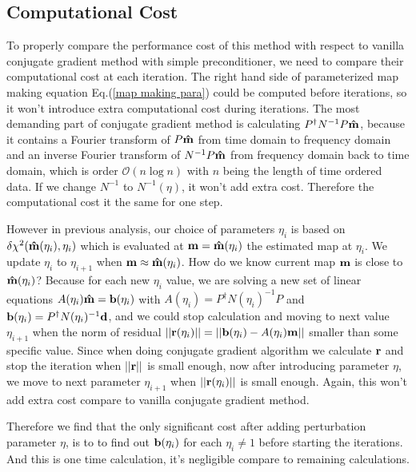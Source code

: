 \documentclass[twocolumn,linenumbers]{aastex631}
\newcommand{\vbd}{\vb{d}}
\newcommand{\vbm}{\vb{m}}
\newcommand{\vbb}{\vb{b}}
\newcommand{\inv}[1]{#1^{-1}}
\newcommand{\hatm}{\vb{\hat{m}}}
\newcommand{\Pdagger}{P^{\dagger}}
\begin{document}
\subsection{Computational Cost}
To properly compare the performance cost of this method with respect to vanilla
conjugate gradient method with simple preconditioner,
we need to compare their computational cost at each iteration.
The right hand side of parameterized map making equation
Eq.(\ref{map making para})
could be computed before iterations,
so it won't introduce extra computational cost during iterations.
The most demanding part of conjugate gradient method is calculating
$\Pdagger \inv{N} P \hatm$, because it contains a Fourier transform of
$P\hatm$ from time domain to frequency domain and an inverse Fourier transform
of $\inv{N} P \hatm$ from frequency domain back to time domain,
which is order $\mathcal{O}(n\log n)$ with $n$ being the length of time ordered
data.
If we change $\inv{N}$ to $\inv{N}(\eta)$, it won't add extra cost.
Therefore the computational cost it the same for one step.

However in previous analysis, our choice of parameters $\eta_i$ is based on
$\delta\chi^2(\hatm(\eta_i), \eta_i)$ which is evaluated at 
$\vbm = \hatm(\eta_i)$ the estimated map at $\eta_i$.
We update $\eta_i$ to $\eta_{i+1}$ when $\vbm \approx \hatm(\eta_i)$. 
How do we know current map $\vbm$ is close to $\hatm(\eta_i)$? 
Because for each new $\eta_i$ value, we are solving a new set of linear
equations $A(\eta_i) \hatm = \vbb(\eta_i)$ with
$A(\eta_i) = \Pdagger \inv{N(\eta_i)} P$ and 
$\vbb(\eta_i) = \Pdagger \inv{N(\eta_i)} \vbd$,
and we could stop calculation and moving to next value $\eta_{i+1}$ when the 
norm of residual 
$\qty||\vb{r}(\eta_i)|| = \qty||\vbb(\eta_i) - A(\eta_i) \vbm||$
smaller than some specific value.
Since when doing conjugate gradient algorithm we calculate $\vb{r}$ and stop
the iteration when $\qty||\vb{r}||$ is small enough, now after introducing
parameter $\eta$, we move to next parameter $\eta_{i+1}$ when 
$\qty||\vb{r}(\eta_i)||$ is small enough.
Again, this won't add extra cost compare to vanilla conjugate gradient method.

Therefore we find that the only significant cost after adding perturbation
parameter $\eta$, is to to find out $\vb{b}(\eta_i)$ for each $\eta_i\neq1$
before starting the iterations.
And this is one time calculation, it's negligible compare to remaining
calculations.
\end{document}
